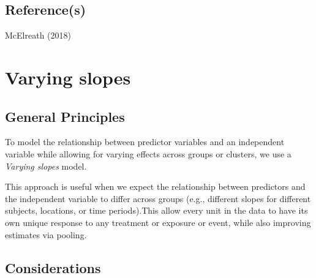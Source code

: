 \documentclass[
  letterpaper,
  DIV=11,
  numbers=noendperiod]{scrreprt}
\begin{document}
\section{Reference(s)}\label{references-11}

McElreath (2018)


\chapter{Varying slopes}\label{varying-slopes}

\section{General Principles}\label{general-principles-12}

To model the relationship between predictor variables and an independent
variable while allowing for varying effects across groups or clusters,
we use a \emph{Varying slopes} model.

This approach is useful when we expect the relationship between
predictors and the independent variable to differ across groups (e.g.,
different slopes for different subjects, locations, or time
periods).This allow every unit in the data to have its own unique
response to any treatment or exposure or event, while also improving
estimates via pooling.

\section{Considerations}\label{considerations-12}
\end{document}
